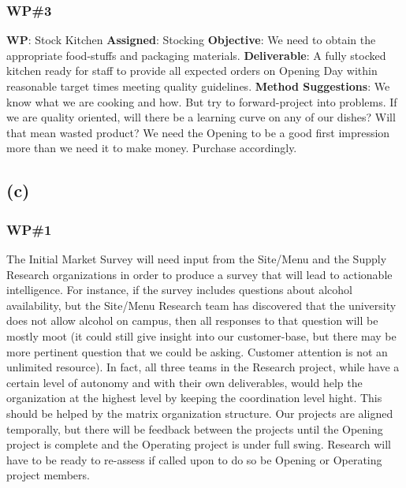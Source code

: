 \documentclass{article}
\begin{document}
	\subsubsection*{WP\#3}
		\textbf{WP}: Stock Kitchen\newline
		\textbf{Assigned}: Stocking\newline
		\textbf{Objective}: We need to obtain the appropriate food-stuffs and packaging materials.\newline
		\textbf{Deliverable}: A fully stocked kitchen ready for staff to provide all expected orders on Opening Day within reasonable target times meeting quality guidelines.\newline
		\textbf{Method Suggestions}: We know what we are cooking and how. But try to forward-project into problems. If we are quality oriented, will there be a learning curve on any of our dishes? Will that mean wasted product? We 		need the Opening to be a good first impression more than we need it to make money. Purchase accordingly.\newline

	\subsection*{\quad(c)}
	\subsubsection*{WP\#1}
	The Initial Market Survey will need input from the Site/Menu and the Supply Research organizations in order to produce a survey that will lead to actionable intelligence. For instance, if the survey includes questions about alcohol 	availability, but the Site/Menu Research team has discovered that the university does not allow alcohol on campus, then all responses to that question will be mostly moot (it could still give insight into our customer-base, but there 	may be more pertinent question that we could be asking. Customer attention is not an unlimited resource).
	\newline
	In fact, all three teams in the Research project, while have a certain level of autonomy and with their own deliverables, would help the organization at the highest level by keeping the coordination level hight. This should be helped 	by the matrix organization structure. Our projects are aligned temporally, but there will be feedback between the projects until the Opening project is complete and the Operating project is under full swing. Research will have to be 	ready to re-assess if called upon to do so be Opening or Operating project members.
\end{document}
